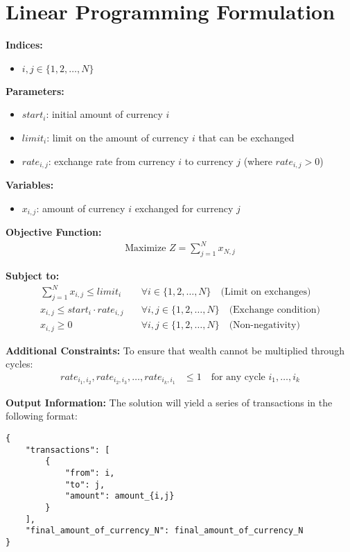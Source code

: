 \documentclass{article}
\begin{document}
\section*{Linear Programming Formulation}

\textbf{Indices:}
\begin{itemize}
    \item $i, j \in \{1, 2, \ldots, N\}$ 
\end{itemize}

\textbf{Parameters:}
\begin{itemize}
    \item $start_i$: initial amount of currency $i$
    \item $limit_i$: limit on the amount of currency $i$ that can be exchanged
    \item $rate_{i,j}$: exchange rate from currency $i$ to currency $j$ (where $rate_{i,j} > 0$)
\end{itemize}

\textbf{Variables:}
\begin{itemize}
    \item $x_{i,j}$: amount of currency $i$ exchanged for currency $j$
\end{itemize}

\textbf{Objective Function:}
\begin{align*}
    \text{Maximize } Z = \sum_{j=1}^{N} x_{N,j}
\end{align*}

\textbf{Subject to:}
\begin{align*}
    \sum_{j=1}^{N} x_{i,j} \leq limit_i \quad & \forall i \in \{1, 2, \ldots, N\} \quad \text{(Limit on exchanges)} \\
    x_{i,j} \leq start_i \cdot rate_{i,j} \quad & \forall i,j \in \{1, 2, \ldots, N\} \quad \text{(Exchange condition)} \\
    x_{i,j} \geq 0 \quad & \forall i,j \in \{1, 2, \ldots, N\} \quad \text{(Non-negativity)}
\end{align*}

\textbf{Additional Constraints:}
To ensure that wealth cannot be multiplied through cycles:
\begin{align*}
    rate_{i_1,i_2}, rate_{i_2,i_3}, \ldots, rate_{i_k,i_1} & \leq 1 \quad \text{for any cycle } i_1, \ldots, i_k
\end{align*}

\textbf{Output Information:}
The solution will yield a series of transactions in the following format:
\begin{verbatim}
{
    "transactions": [
        {
            "from": i,
            "to": j,
            "amount": amount_{i,j}
        }
    ],
    "final_amount_of_currency_N": final_amount_of_currency_N
}
\end{verbatim}
\end{document}
